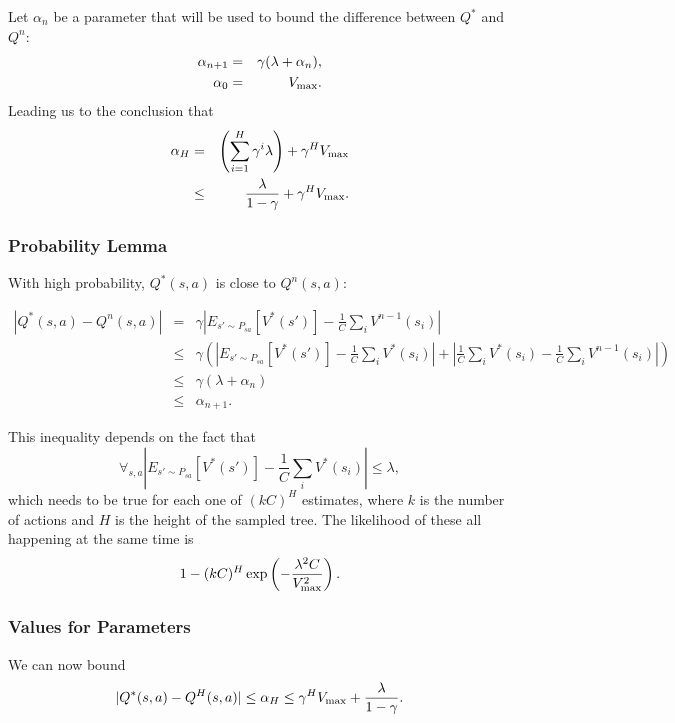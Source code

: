 Let $\alpha_n$ be a parameter that will be used to bound the difference between $Q^*$ and $Q^n$:
\begin{eqnarray}
\alpha_{n+1}&=&\gamma(\lambda + \alpha_n),\\
\alpha_0&=&V_{\rm max}.
\end{eqnarray}
Leading us to the conclusion that
\begin{eqnarray}
\alpha_H &=& \left(\sum_{i=1}^H \gamma^i \lambda\right)+\gamma^HV_{\rm max}\\
 &\leq& \frac \lambda {1-\gamma}+\gamma^HV_{\rm max}.
\end{eqnarray} 

\subsubsection{ Probability Lemma} With high probability, $Q^*(s,a)$ is close to $Q^n(s,a)$:

\begin{eqnarray}
|Q^*(s,a)-Q^n(s,a)| &=& \gamma\left|E_{s'\sim P_{sa}}[V^*(s')] - \frac 1 C \sum_i V^{n-1}(s_i)\right| \nonumber\\
&\leq& \gamma \left(\left|E_{s'\sim P_{sa}}[V^*(s')] - \frac 1 C \sum_i V^*(s_i)\right| + \left|\frac 1 C \sum_i V^*(s_i) - \frac 1 C \sum_i V^{n-1}(s_i)\right|\right)\\
&\leq& \gamma (\lambda + \alpha_n)\\
&\leq& \alpha_{n+1}.
\end{eqnarray}

This inequality depends on the fact that
$$\forall_{s,a}\left|E_{s'\sim P_{sa}}[V^*(s')] - \frac 1 C \sum_i V^*(s_i)\right|\leq \lambda,$$
which needs to be true for each one of $(kC)^H$ estimates, where $k$ is the number of actions and $H$ is the height of the sampled tree. The likelihood of these all happening at the same time is
$$1-(kC)^H\exp\left(-\frac{\lambda^2 C}{V_{\rm max}^2}\right).$$ 

\subsubsection{Values for Parameters}

We can now bound 
$$|Q^*(s,a)-Q^H(s,a)|\leq \alpha_H \leq \gamma^HV_{\rm max} + \frac{\lambda}{1-\gamma}.$$


